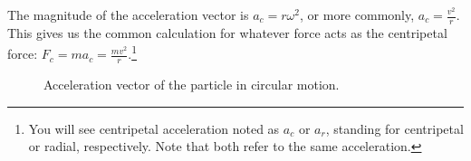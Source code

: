The magnitude of the acceleration vector is $a_c =r \omega^2$, or more commonly, $a_c = \frac{v^2}{r}$. This gives us the common calculation for whatever force acts as the centripetal force: $F_c = m a_c = \frac{m v^2}{r}$.\footnote{You will see centripetal acceleration noted as $a_c$ or $a_r$, standing for centripetal or radial, respectively. Note that both refer to the same acceleration.}

\begin{figure}[H]
  \begin{center}
  \end{center}
  \caption{Acceleration vector of the particle in circular motion.}
  \label{fig:billardBallAcceleration}
\end{figure}

